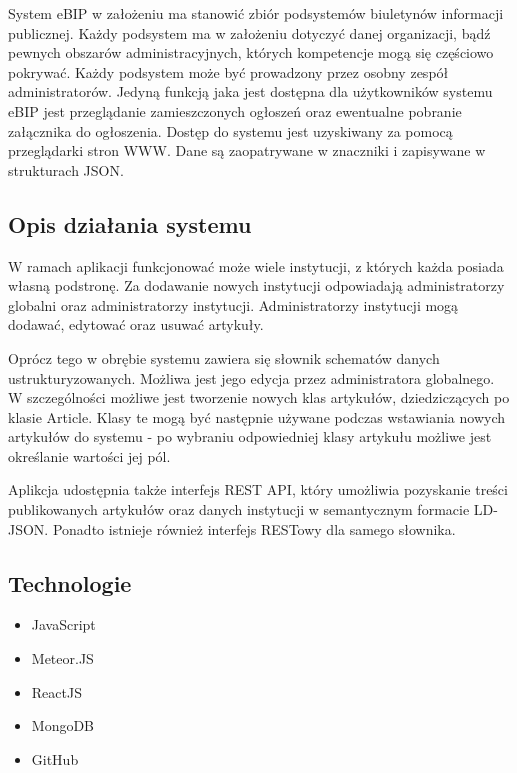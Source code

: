 \documentclass{article}
\begin{document}
	System eBIP w założeniu ma stanowić zbiór podsystemów biuletynów informacji publicznej. Każdy podsystem ma w założeniu dotyczyć danej organizacji, bądź pewnych obszarów administracyjnych, których kompetencje mogą się częściowo pokrywać. Każdy podsystem może być prowadzony przez osobny zespół administratorów. Jedyną funkcją jaka jest dostępna dla użytkowników systemu eBIP jest przeglądanie zamieszczonych ogłoszeń oraz ewentualne pobranie załącznika do ogłoszenia. Dostęp do systemu jest uzyskiwany za pomocą przeglądarki stron WWW. Dane są zaopatrywane w znaczniki i zapisywane w strukturach JSON. 

	
\subsection{Opis działania systemu}

	W ramach aplikacji funkcjonować może wiele instytucji, z których każda posiada własną podstronę. Za dodawanie nowych instytucji odpowiadają administratorzy globalni oraz administratorzy instytucji. Administratorzy instytucji mogą dodawać, edytować oraz usuwać artykuły. 
	
	Oprócz tego w obrębie systemu zawiera się słownik schematów danych ustrukturyzowanych. Możliwa jest jego edycja przez administratora globalnego. W szczególności możliwe jest tworzenie nowych klas artykułów, dziedziczących po klasie Article. Klasy te mogą być następnie używane podczas wstawiania nowych artykułów do systemu - po wybraniu odpowiedniej klasy artykułu możliwe jest określanie wartości jej pól.
	
	Aplikcja udostępnia także interfejs REST API, który umożliwia pozyskanie treści publikowanych artykułów oraz danych instytucji w semantycznym formacie LD-JSON. Ponadto istnieje również interfejs RESTowy dla samego słownika.
 
	 \newpage
\subsection{Technologie}
	
\begin{itemize} 
	\item JavaScript
	\item Meteor.JS
	\item ReactJS
	\item MongoDB
	\item GitHub

\end{itemize}
\end{document}
